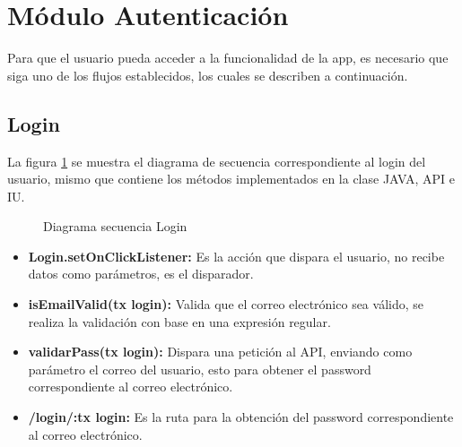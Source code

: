 
\section{Módulo Autenticación}
Para que el usuario pueda acceder a la funcionalidad de la app, es necesario que siga uno de los flujos establecidos, los cuales se describen a continuación.\\


\subsection{Login}

La figura \ref{fig:SecuenciaLogin} se muestra el diagrama de secuencia correspondiente al login del usuario, mismo que contiene los métodos implementados en la clase JAVA, API e IU.

\begin{figure}[htbp!]
	\centering
	\caption{Diagrama secuencia Login}
	\label{fig:SecuenciaLogin}
\end{figure}
\begin{itemize}
	\item \textbf{Login.setOnClickListener:} Es la acción que dispara el usuario, no recibe datos como parámetros, es el disparador.
	\item \textbf{isEmailValid(tx login):} Valida que el correo electrónico sea válido, se realiza la validación con base en una expresión regular.
	\item \textbf{validarPass(tx login):} Dispara una petición al API, enviando como parámetro el correo del usuario, esto para obtener el password correspondiente al correo electrónico.
	\item \textbf{/login/:tx login:} Es la ruta para la obtención del password correspondiente al correo electrónico.
\end{itemize}

